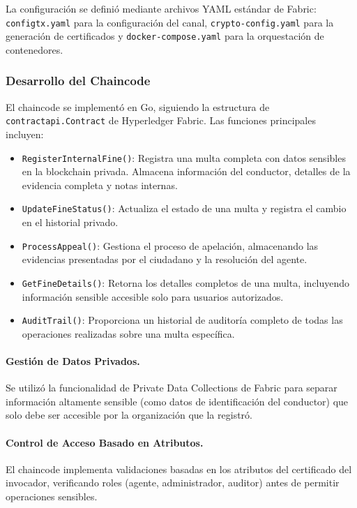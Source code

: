 La configuración se definió mediante archivos YAML estándar de Fabric: \texttt{configtx.yaml} para la configuración del canal, \texttt{crypto-config.yaml} para la generación de certificados y \texttt{docker-compose.yaml} para la orquestación de contenedores.

\subsubsection{Desarrollo del Chaincode}

El chaincode se implementó en Go, siguiendo la estructura de \texttt{contractapi.Contract} de Hyperledger Fabric. Las funciones principales incluyen:

\begin{itemize}
    \item \texttt{RegisterInternalFine()}: Registra una multa completa con datos sensibles en la blockchain privada. Almacena información del conductor, detalles de la evidencia completa y notas internas.
    
    \item \texttt{UpdateFineStatus()}: Actualiza el estado de una multa y registra el cambio en el historial privado.
    
    \item \texttt{ProcessAppeal()}: Gestiona el proceso de apelación, almacenando las evidencias presentadas por el ciudadano y la resolución del agente.
    
    \item \texttt{GetFineDetails()}: Retorna los detalles completos de una multa, incluyendo información sensible accesible solo para usuarios autorizados.
    
    \item \texttt{AuditTrail()}: Proporciona un historial de auditoría completo de todas las operaciones realizadas sobre una multa específica.
\end{itemize}

\paragraph{Gestión de Datos Privados.}
Se utilizó la funcionalidad de Private Data Collections de Fabric para separar información altamente sensible (como datos de identificación del conductor) que solo debe ser accesible por la organización que la registró.

\paragraph{Control de Acceso Basado en Atributos.}
El chaincode implementa validaciones basadas en los atributos del certificado del invocador, verificando roles (agente, administrador, auditor) antes de permitir operaciones sensibles.

